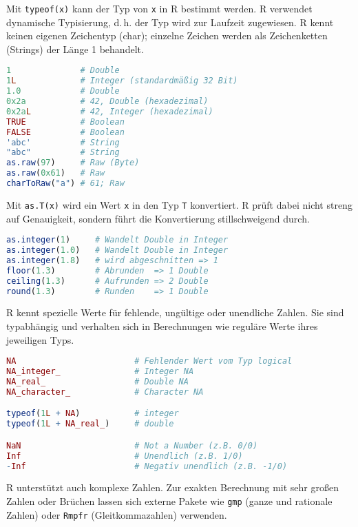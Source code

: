 \documentclass[10pt,twocolumn]{scrartcl}
\begin{document}
Mit \lstinline|typeof(x)| kann der Typ von \lstinline|x| in R bestimmt werden.
R verwendet dynamische Typisierung, d.\,h. der Typ wird zur Laufzeit zugewiesen.
R kennt keinen eigenen Zeichentyp (char); einzelne Zeichen werden als Zeichenketten (Strings) der Länge 1 behandelt.

\begin{lstlisting}[language=R]
1              # Double
1L             # Integer (standardmäßig 32 Bit)
1.0            # Double
0x2a           # 42, Double (hexadezimal)
0x2aL          # 42, Integer (hexadezimal)
TRUE           # Boolean
FALSE          # Boolean
'abc'          # String
"abc"          # String
as.raw(97)     # Raw (Byte)
as.raw(0x61)   # Raw
charToRaw("a") # 61; Raw
\end{lstlisting}

Mit \lstinline|as.T(x)| wird ein Wert \lstinline|x| in den Typ \lstinline|T| konvertiert. R prüft dabei nicht streng auf Genauigkeit, sondern führt die Konvertierung stillschweigend durch.

\begin{lstlisting}[language=R]
as.integer(1)     # Wandelt Double in Integer
as.integer(1.0)   # Wandelt Double in Integer
as.integer(1.8)   # wird abgeschnitten => 1
floor(1.3)        # Abrunden  => 1 Double
ceiling(1.3)      # Aufrunden => 2 Double
round(1.3)        # Runden    => 1 Double
\end{lstlisting}

R kennt spezielle Werte für fehlende, ungültige oder unendliche Zahlen. Sie sind typabhängig und verhalten sich in Berechnungen wie reguläre Werte ihres jeweiligen Typs.

\begin{lstlisting}[language=R]
NA                        # Fehlender Wert vom Typ logical
NA_integer_               # Integer NA
NA_real_                  # Double NA
NA_character_             # Character NA

typeof(1L + NA)           # integer
typeof(1L + NA_real_)     # double

NaN                       # Not a Number (z.B. 0/0)
Inf                       # Unendlich (z.B. 1/0)
-Inf                      # Negativ unendlich (z.B. -1/0)
\end{lstlisting}

R unterstützt auch komplexe Zahlen. Zur exakten Berechnung mit sehr großen Zahlen oder Brüchen lassen sich externe Pakete wie \texttt{gmp} (ganze und rationale Zahlen) oder \texttt{Rmpfr} (Gleitkommazahlen) verwenden.
\end{document}
